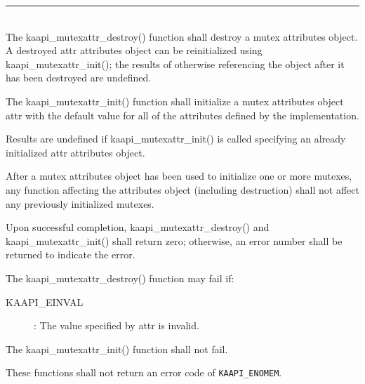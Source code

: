 \begin{description}
\vspace*{3ex} \hrule width 4cm
\vspace*{3ex} 
\item [\texttt{int kaapi\_mutexattr\_init (kaapi\_mutexattr\_t *attr)}]
\item [\texttt{int kaapi\_mutexattr\_destroy (kaapi\_mutexattr\_t *attr)}]~\\

The kaapi\_mutexattr\_destroy() function shall destroy a mutex attributes
object. A destroyed attr attributes object can be reinitialized using
kaapi\_mutexattr\_init(); the results of otherwise referencing the object
after it has been destroyed are undefined.

The kaapi\_mutexattr\_init() function shall initialize a mutex attributes
object attr with the default value for all of the attributes defined by the
implementation.

Results are undefined if kaapi\_mutexattr\_init() is called specifying an
already initialized attr attributes object.

After a mutex attributes object has been used to initialize one or more
mutexes, any function affecting the attributes object (including destruction)
shall not affect any previously initialized mutexes.

Upon successful completion, kaapi\_mutexattr\_destroy() and
kaapi\_mutexattr\_init() shall return zero; otherwise, an error number shall
be returned to indicate the error.

The kaapi\_mutexattr\_destroy() function may fail if:

\begin{description}
\item [KAAPI\_EINVAL]: The value specified by attr is invalid.
\end{description}

The kaapi\_mutexattr\_init() function shall not fail.

These functions shall not return an error code of \verb+KAAPI_ENOMEM+.
\end{description}


